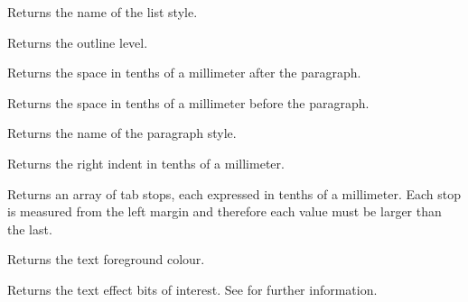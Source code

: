 Returns the name of the list style.

\label{wxtextattrgetoutlinelevel}


Returns the outline level.

\label{wxtextattrgetparagraphspacingafter}


Returns the space in tenths of a millimeter after the paragraph.

\label{wxtextattrgetparagraphspacingbefore}


Returns the space in tenths of a millimeter before the paragraph.

\label{wxtextattrgetparagraphstylename}


Returns the name of the paragraph style.

\label{wxtextattrgetrightindent}


Returns the right indent in tenths of a millimeter.

\label{wxtextattrgettabs}


Returns an array of tab stops, each expressed in tenths of a millimeter. Each stop
is measured from the left margin and therefore each value must be larger than the last.

\label{wxtextattrgettextcolour}


Returns the text foreground colour.

\label{wxtextattrgettexteffectflags}


Returns the text effect bits of interest. See  for further information.

